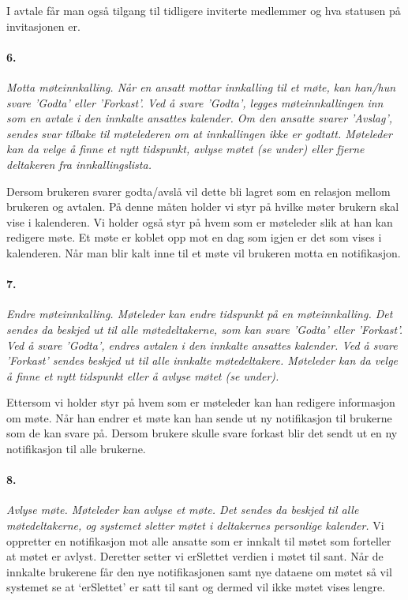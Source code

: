 \documentclass[titlepage]{article}
\begin{document}
I avtale får man også tilgang til tidligere inviterte medlemmer og hva statusen på invitasjonen er. 


\paragraph{6.}\textit{ Motta møteinnkalling. Når en ansatt mottar innkalling til et møte, kan han/hun svare
'Godta' eller 'Forkast'. Ved å svare 'Godta', legges møteinnkallingen inn som en avtale
i den innkalte ansattes kalender. Om den ansatte svarer 'Avslag', sendes svar tilbake til
møtelederen om at innkallingen ikke er godtatt. Møteleder kan da velge å finne et nytt
tidspunkt, avlyse møtet (se under) eller fjerne deltakeren fra innkallingslista.}

Dersom brukeren svarer godta/avslå vil dette bli lagret som en relasjon mellom brukeren og avtalen. På denne måten holder vi styr på hvilke møter brukern skal vise i kalenderen. Vi holder også styr på hvem som er møteleder slik at han kan redigere møte. Et møte er koblet opp mot en dag som igjen er det som vises i kalenderen. Når man blir kalt inne til et møte vil brukeren motta en notifikasjon.


\paragraph{7.}\textit{ Endre møteinnkalling. Møteleder kan endre tidspunkt på en møteinnkalling. Det
sendes da beskjed ut til alle møtedeltakerne, som kan svare 'Godta' eller 'Forkast'. Ved
å svare 'Godta', endres avtalen i den innkalte ansattes kalender. Ved å svare 'Forkast'
sendes beskjed ut til alle innkalte møtedeltakere. Møteleder kan da velge å finne et
nytt tidspunkt eller å avlyse møtet (se under).}

Ettersom vi holder styr på hvem som er møteleder kan han redigere informasjon om møte. Når han endrer et møte kan han sende ut ny notifikasjon til brukerne som de kan svare på. Dersom brukere skulle svare forkast blir det sendt ut en ny notifikasjon til alle brukerne.

\paragraph{8.}\textit{ Avlyse møte. Møteleder kan avlyse et møte. Det sendes da beskjed til alle
møtedeltakerne, og systemet sletter møtet i deltakernes personlige kalender.}
Vi oppretter en notifikasjon mot alle ansatte som er innkalt til møtet som forteller at møtet er avlyst. Deretter setter vi erSlettet verdien i møtet til sant. Når de innkalte brukerene får den nye notifikasjonen samt nye dataene om møtet så vil systemet se at ‘erSlettet’ er satt til sant og dermed vil ikke møtet vises lengre.
\end{document}
